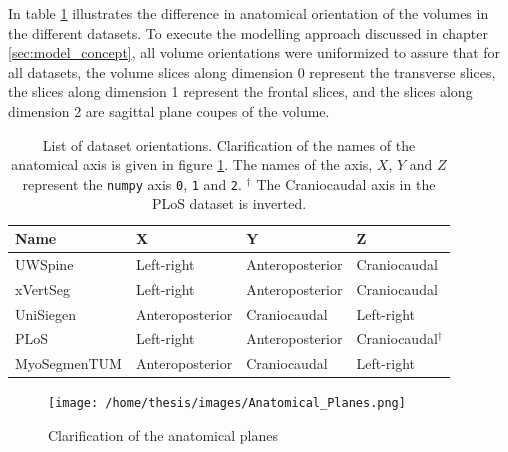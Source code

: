 In table \ref{tab:dataOrientation} illustrates the difference in anatomical orientation of the volumes in the different datasets.
To execute the modelling approach discussed in chapter \ref{sec:model_concept}, all volume orientations were uniformized to assure that for all datasets, the volume slices along dimension 0 represent the transverse slices, 
the slices along dimension 1 represent the frontal slices, and the slices along dimension 2 are sagittal plane coupes of the volume.

\begin{table}
 
    \begin{tabular}{ l l l l} 
     \hline
     \hline
     Name & X & Y & Z \\
     \hline 
    UWSpine & Left-right & Anteroposterior & Craniocaudal \\
    xVertSeg & Left-right & Anteroposterior & Craniocaudal \\
    UniSiegen  &  Anteroposterior & Craniocaudal & Left-right \\
    PLoS & Left-right & Anteroposterior & Craniocaudal$^\dagger$ \\
    MyoSegmenTUM &  Anteroposterior & Craniocaudal & Left-right \\
     \hline
     \hline
    \end{tabular}
    \caption{List of dataset orientations. Clarification of the names of the anatomical axis is given in figure \ref{fig:anatomicalPlains}.
    The names of the axis, $X$, $Y$ and $Z$ represent the \texttt{numpy} axis \texttt{0}, \texttt{1} and \texttt{2}.
    $^\dagger$ The Craniocaudal axis in the PLoS dataset is inverted.\label{tab:dataOrientation}}

\end{table}

\begin{figure}
    \centering
    \texttt{[image: /home/thesis/images/Anatomical\_Planes.png]}
    \caption{Clarification of the anatomical planes\label{fig:anatomicalPlains}}
  \end{figure}

